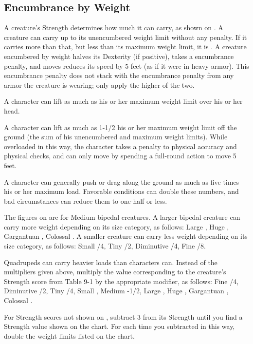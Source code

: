 \subsection{Encumbrance by Weight}
A creature's Strength determines how much it can carry, as shown on . A creature can carry up to its unencumbered weight limit without any penalty. If it carries more than that, but less than its maximum weight limit, it is . A creature encumbered by weight halves its Dexterity (if positive), takes a  encumbrance penalty, and moves reduces its speed by 5 feet (as if it were in heavy armor). This encumbrance penalty does not stack with the encumbrance penalty from any armor the creature is wearing; only apply the higher of the two.

 A character can lift as much as his or her maximum weight limit over his or her head.

A character can lift as much as 1-1/2 his or her maximum weight limit off the ground (the sum of his unencumbered and maximum weight limits). While overloaded in this way, the character takes a  penalty to physical accuracy and physical checks, and can only move by spending a full-round action to move 5 feet.

A character can generally push or drag along the ground as much as five times his or her maximum load. Favorable conditions can double these numbers, and bad circumstances can reduce them to one-half or less.

 The figures on  are for Medium bipedal creatures. A larger bipedal creature can carry more weight depending on its size category, as follows: Large , Huge , Gargantuan , Colossal . A smaller creature can carry less weight depending on its size category, as follows: Small /4, Tiny /2, Diminutive /4, Fine /8.

Quadrupeds can carry heavier loads than characters can. Instead of the multipliers given above, multiply the value corresponding to the creature's Strength score from Table 9-1 by the appropriate modifier, as follows: Fine /4, Diminutive /2, Tiny /4, Small , Medium -1/2, Large , Huge , Gargantuan , Colossal .

 For Strength scores not shown on , subtract 3 from its Strength until you find a Strength value shown on the chart. For each time you subtracted in this way, double the weight limits listed on the chart.

